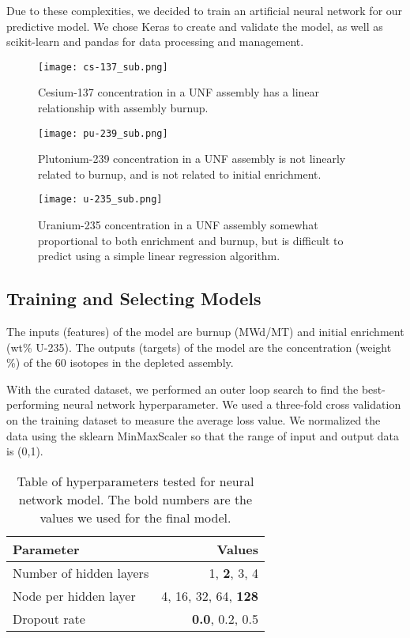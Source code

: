 Due to these complexities, we decided to train an artificial
neural network for our predictive model. We chose
Keras \cite{collet_keras_2015} to create and validate the model,
as well as scikit-learn \cite{pedregosa_scikit-learn_2011}
and pandas \cite{mckinney-proc-scipy-2010} for data processing and management.

\begin{figure}
    \centering
    \texttt{[image: cs-137\_sub.png]}
    \caption{Cesium-137 concentration in a \gls{UNF} assembly
             has a linear relationship with assembly burnup.}
    \label{fig:cs_137}
\end{figure}

\begin{figure}
    \centering
    \texttt{[image: pu-239\_sub.png]}
    \caption{Plutonium-239 concentration in a \gls{UNF} assembly
             is not linearly related to burnup, and is
             not related to initial enrichment.}
    \label{fig:pu_239}
\end{figure}


\begin{figure}
    \centering
    \texttt{[image: u-235\_sub.png]}
    \caption{Uranium-235 concentration in a \gls{UNF} assembly
             somewhat proportional to both enrichment and
             burnup, but is difficult to predict using
             a simple linear regression algorithm.}
    \label{fig:u_235}
\end{figure}


\subsection{Training and Selecting Models}

The inputs (features) of the model are
burnup (MWd/MT) and initial enrichment (wt\% U-235).
The outputs (targets) of the model are
the concentration (weight \%) of the 60 isotopes in the
depleted assembly.

With the curated dataset, we performed an outer loop
search to find the best-performing neural network
hyperparameter. We used a three-fold
cross validation on the training dataset to
measure the average loss value. We
normalized the data using the sklearn MinMaxScaler
so that the range of input and output data is (0,1).

\begin{table}[h]
    \centering
    \begin{tabular}{lr}
        \hline
        Parameter & Values \\
        \hline
        Number of hidden layers & 1, \textbf{2}, 3, 4 \\
        Node per hidden layer & 4, 16, 32, 64, \textbf{128} \\
        Dropout rate & \textbf{0.0}, 0.2, 0.5 \\
        \hline
    \end{tabular}
    \caption{Table of hyperparameters tested
             for neural network model. The bold
             numbers are the values we used for the final model.}
\end{table}


